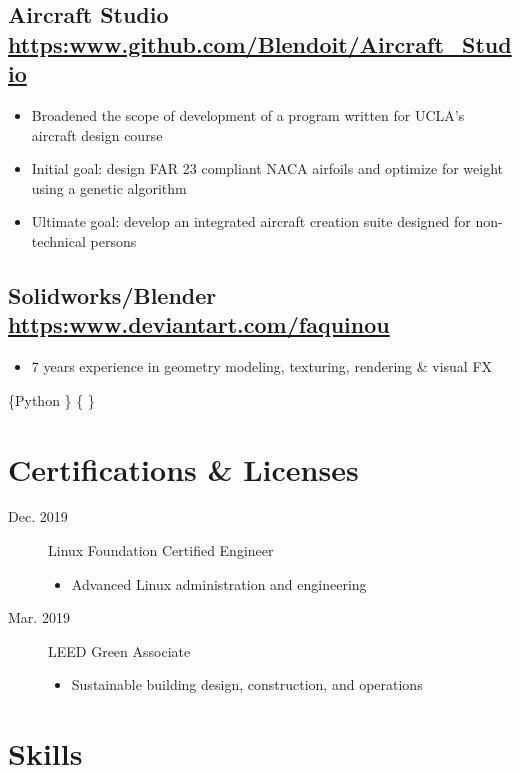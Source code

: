 \documentclass[11pt]{article}
\begin{document}
\subsection*{Aircraft Studio \url{https:www.github.com/Blendoit/Aircraft\_Studio}}
\label{sec:orga999cec}
\begin{itemize}
\item Broadened the scope of development of a program written for UCLA's aircraft design course
\item Initial goal: design FAR 23 compliant NACA airfoils and optimize for weight using a genetic algorithm
\item Ultimate goal: develop an integrated aircraft creation suite designed for non-technical persons
\end{itemize}

\subsection*{Solidworks/Blender \url{https:www.deviantart.com/faquinou}}
\label{sec:org285686c}
\begin{itemize}
\item 7 years experience in geometry modeling, texturing, rendering \& visual FX
\end{itemize}

\{Python \url{}\}
\{ \url{}\}

\section*{Certifications \& Licenses}
\label{sec:org918fe46}
\begin{description}
\item[{Dec. 2019}] Linux Foundation Certified Engineer
\begin{itemize}
\item Advanced Linux administration and engineering
\end{itemize}
\item[{Mar. 2019}] LEED Green Associate
\begin{itemize}
\item Sustainable building design, construction, and operations
\end{itemize}
\end{description}

\section*{Skills}
\label{sec:org2774e5c}
\end{document}
